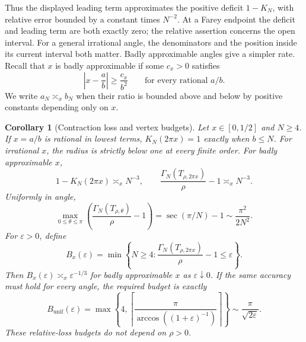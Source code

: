 \documentclass[11pt,a4paper]{article}
\newtheorem{corollary}[theorem]{Corollary}
\theoremstyle{definition}
\theoremstyle{remark}
\numberwithin{equation}{section}
\begin{document}
Thus the displayed leading term approximates the positive deficit
$1-K_N$, with relative error bounded by a constant times $N^{-2}$.
At a Farey endpoint the deficit and leading term are both exactly zero;
the relative assertion concerns the open interval.  For a general
irrational angle, the denominators and the position inside its current
interval both matter.  Badly approximable angles give a simpler rate.
Recall that $x$ is badly approximable if some $c_x>0$ satisfies
\[
 \left|x-\frac ab\right|\ge\frac{c_x}{b^2}
 \qquad\text{for every rational }a/b.
\]
We write $a_N\asymp_x b_N$ when their ratio is bounded above and below
by positive constants depending only on $x$.

\begin{corollary}[Contraction loss and vertex budgets]
\label{cor:complexity-asymptotic}
Let $x\in[0,1/2]$ and $N\ge4$.  If $x=a/b$ is rational in lowest
terms, $K_N(2\pi x)=1$ exactly when $b\le N$.  For irrational $x$, the radius
is strictly below one at every finite order.  For badly approximable $x$,
\begin{equation}\label{eq:badly-approximable-loss}
 1-K_N(2\pi x)\asymp_x N^{-3},\qquad
 \frac{\Gamma_N(T_{\rho,2\pi x})}{\rho}-1\asymp_x N^{-3}.
\end{equation}
Uniformly in angle,
\begin{equation}\label{eq:uniform-relative-loss}
 \max_{0\le\theta\le\pi}
 \left(\frac{\Gamma_N(T_{\rho,\theta})}{\rho}-1\right)
 =\sec(\pi/N)-1\sim\frac{\pi^2}{2N^2}.
\end{equation}
For $\varepsilon>0$, define
\[
 B_x(\varepsilon)=\min\left\{N\ge4:
   \frac{\Gamma_N(T_{\rho,2\pi x})}{\rho}-1\le\varepsilon\right\}.
\]
Then $B_x(\varepsilon)\asymp_x\varepsilon^{-1/3}$ for badly
approximable $x$ as $\varepsilon\downarrow0$.  If the same accuracy
must hold for every angle, the required budget is exactly
\begin{equation}\label{eq:uniform-vertex-budget}
 B_{\mathrm{unif}}(\varepsilon)
 =\max\left\{4,
   \left\lceil\frac{\pi}{\arccos((1+\varepsilon)^{-1})}\right\rceil\right\}
 \sim\frac{\pi}{\sqrt{2\varepsilon}}.
\end{equation}
These relative-loss budgets do not depend on $\rho>0$.
\end{corollary}
\end{document}
